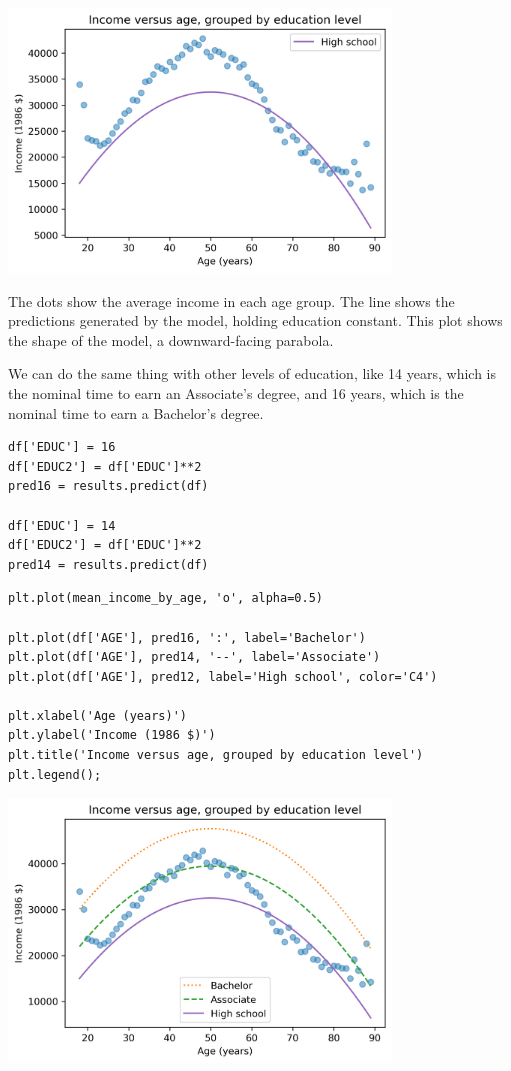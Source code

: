 \begin{center}
\includegraphics[width=4in]{10_regression_files/10_regression_53_0.png}
\end{center}

The dots show the average income in each age group. The line shows the
predictions generated by the model, holding education constant. This
plot shows the shape of the model, a downward-facing parabola.

We can do the same thing with other levels of education, like 14 years,
which is the nominal time to earn an Associate's degree, and 16 years,
which is the nominal time to earn a Bachelor's degree.

\begin{lstlisting}[]
df['EDUC'] = 16
df['EDUC2'] = df['EDUC']**2
pred16 = results.predict(df)

df['EDUC'] = 14
df['EDUC2'] = df['EDUC']**2
pred14 = results.predict(df)
\end{lstlisting}

\begin{lstlisting}[]
plt.plot(mean_income_by_age, 'o', alpha=0.5)

plt.plot(df['AGE'], pred16, ':', label='Bachelor')
plt.plot(df['AGE'], pred14, '--', label='Associate')
plt.plot(df['AGE'], pred12, label='High school', color='C4')

plt.xlabel('Age (years)')
plt.ylabel('Income (1986 $)')
plt.title('Income versus age, grouped by education level')
plt.legend();
\end{lstlisting}

\begin{center}
\includegraphics[width=4in]{10_regression_files/10_regression_56_0.png}
\end{center}

